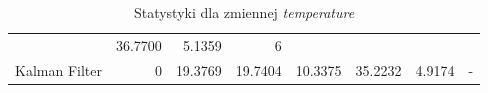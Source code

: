 \documentclass[12pt,twoside]{article}
\begin{document}
\begin{table}
\begin{tabular}{|l|r|r|r|r|r|r|l|}
			 &
				36.7700


			 &
				5.1359


			 &
				6


			 \\

				Kalman
				Filter


			 &
				0


			 &
				19.3769


			 &
				19.7404


			 &
				10.3375


			 &
				35.2232


			 &
				4.9174


			 &
				-


			 \\
        \bottomrule
    \end{tabular}
    \caption{Statystyki dla zmiennej \emph{temperature}}
    \label{tab:wynikitemp}
\end{table}
\end{document}
